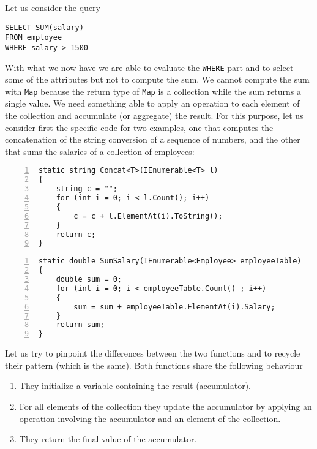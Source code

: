Let us consider the query

\begin{lstlisting}[caption = Example query for Reduce, label = code:reduce_query]
SELECT SUM(salary)
FROM employee
WHERE salary > 1500
\end{lstlisting}

\noindent
With what we now have we are able to evaluate the \texttt{WHERE} part and to select some of the attributes but not to compute the sum. We cannot compute the sum with \texttt{Map} because the return type of \texttt{Map} is a collection while the sum returns a single value. We need something able to apply an operation to each element of the collection and accumulate (or aggregate) the result. For this purpose, let us consider first the specific code for two examples, one that computes the concatenation of the string conversion of a sequence of numbers, and the other that sums the salaries of a collection of employees:

\begin{minipage}[t]{0.45\textwidth}
	\begin{lstlisting}[numbers = left, label = code:reduce_comparison_left, caption = Code to concatenate the string representations of numbers]
static string Concat<T>(IEnumerable<T> l)
{
	string c = "";
	for (int i = 0; i < l.Count(); i++)
	{
		c = c + l.ElementAt(i).ToString();
	}
	return c;
}
	\end{lstlisting}
\end{minipage}\hfill
\begin{minipage}[t]{0.45\textwidth}
	\begin{lstlisting}[numbers = left, label = code:reduce_comparison_right, caption = Code to compute the sum of the salaries of the employees]
static double SumSalary(IEnumerable<Employee> employeeTable)
{
	double sum = 0;
	for (int i = 0; i < employeeTable.Count() ; i++)
	{
		sum = sum + employeeTable.ElementAt(i).Salary;
	}
	return sum;
}
	\end{lstlisting}
\end{minipage}

\noindent
Let us try to pinpoint the differences between the two functions and to recycle their pattern (which is the same). Both functions share the following behaviour

\begin{enumerate}[noitemsep]
	\item They initialize a variable containing the result (accumulator).
	\item For all elements of the collection they update the accumulator by applying an operation involving the accumulator and an element of the collection.
	\item They return the final value of the accumulator.
\end{enumerate}


